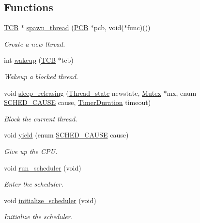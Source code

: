 \subsection*{Functions}
\begin{DoxyCompactItemize}
\item 
\hyperlink{structthread__control__block}{T\+CB} $\ast$ \hyperlink{group__scheduler_ga34517ad777ad754965f80fe0248c16e5}{spawn\+\_\+thread} (\hyperlink{group__proc_gadf327f09ee935cf1734c14e8849f0421}{P\+CB} $\ast$pcb, void($\ast$func)())
\begin{DoxyCompactList}\small\item\em Create a new thread. \end{DoxyCompactList}\item 
int \hyperlink{group__scheduler_gae8301452fd9ae5bf7cd7f2676650ff06}{wakeup} (\hyperlink{structthread__control__block}{T\+CB} $\ast$tcb)
\begin{DoxyCompactList}\small\item\em Wakeup a blocked thread. \end{DoxyCompactList}\item 
void \hyperlink{group__scheduler_ga0ab1a2dcfbfe3fb09cc24044efddfd34}{sleep\+\_\+releasing} (\hyperlink{group__scheduler_ga6c969c169777f82c104cf73e501df70f}{Thread\+\_\+state} newstate, \hyperlink{group__syscalls_gaef2ec62cae8e0031fd19fc8b91083ade}{Mutex} $\ast$mx, enum \hyperlink{group__scheduler_gaad787d8d80312ffca3c0f197b3a25fbe}{S\+C\+H\+E\+D\+\_\+\+C\+A\+U\+SE} cause, \hyperlink{bios_8h_ae7291e5cd742fb9bc6d4aaa0d51bd0ee}{Timer\+Duration} timeout)
\begin{DoxyCompactList}\small\item\em Block the current thread. \end{DoxyCompactList}\item 
void \hyperlink{group__scheduler_ga1db327892199949812ae5a52119f2e97}{yield} (enum \hyperlink{group__scheduler_gaad787d8d80312ffca3c0f197b3a25fbe}{S\+C\+H\+E\+D\+\_\+\+C\+A\+U\+SE} cause)
\begin{DoxyCompactList}\small\item\em Give up the C\+PU. \end{DoxyCompactList}\item 
void \hyperlink{group__scheduler_ga147600b59d656eb9d9558673c2fad36d}{run\+\_\+scheduler} (void)
\begin{DoxyCompactList}\small\item\em Enter the scheduler. \end{DoxyCompactList}\item 
void \hyperlink{group__scheduler_ga244fb594301322e79d11a7844c759bba}{initialize\+\_\+scheduler} (void)
\begin{DoxyCompactList}\small\item\em Initialize the scheduler. \end{DoxyCompactList}\end{DoxyCompactItemize}
